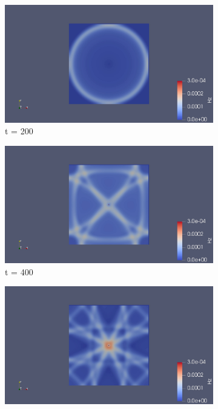 \begin{figure}[h!]
	\centering
	\begin{subfigure}{.49\textwidth}
		\centering
		\includegraphics[width=.95\linewidth]{Figures/FDTD2DH1}
		\caption{t = 200}
	\end{subfigure}
	\begin{subfigure}{.49\textwidth}
		\centering
		\includegraphics[width=.95\linewidth]{Figures/FDTD2DH2}
		\caption{t = 400}
	\end{subfigure}
	\begin{subfigure}{.49\textwidth}
		\centering
		\includegraphics[width=.95\linewidth]{Figures/FDTD2DH3}

\end{subfigure}
\end{figure}
